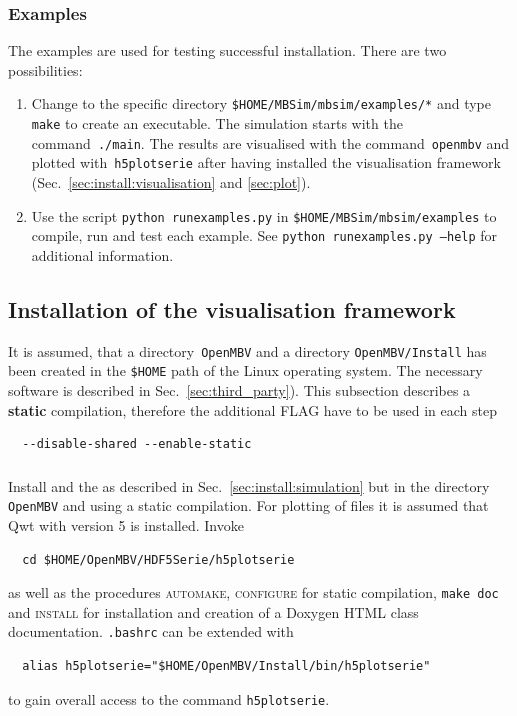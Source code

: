 \subsubsection{Examples}
The examples are used for testing successful installation. There are two possibilities:
\begin{enumerate}
\item Change to the specific directory \texttt{\$HOME/MBSim/mbsim/examples/*} and type \texttt{make} to create an executable. The simulation starts with the command~\texttt{./main}. The results are visualised with the command~\texttt{openmbv} and plotted with~\texttt{h5plotserie} after having installed the visualisation framework (Sec.~\ref{sec:install:visualisation} and \ref{sec:plot}).
\item Use the script \texttt{python runexamples.py} in \texttt{\$HOME/MBSim/mbsim/examples} to compile, run and test each example. See \texttt{python runexamples.py --help} for additional information.
\end{enumerate}
%
\subsection{Installation of the visualisation framework\label{sec:install:visualisation}}
It is assumed, that a directory~\texttt{OpenMBV} and a directory \texttt{OpenMBV/Install} has been created in the \texttt{\$HOME} path of the Linux operating system. The necessary software is described in Sec.~\ref{sec:third_party}). This subsection describes a \textbf{static} compilation, therefore the additional FLAG have to be used in each step
\begin{verbatim}
  --disable-shared --enable-static
\end{verbatim}

\subsubsection{\HDF}
Install \HDF{} and the \HDFSerie{} as described in Sec.~\ref{sec:install:simulation} but in the directory \texttt{OpenMBV} and using a static compilation. For plotting of \HDF{} files it is assumed that Qwt with version 5 is installed. Invoke 
\begin{verbatim}
  cd $HOME/OpenMBV/HDF5Serie/h5plotserie
\end{verbatim}
as well as the procedures \textsc{automake, configure} for static compilation, \texttt{make doc} and \textsc{install} for installation and creation of a Doxygen HTML class documentation. \texttt{.bashrc} can be extended with
\begin{verbatim}
  alias h5plotserie="$HOME/OpenMBV/Install/bin/h5plotserie"
\end{verbatim}
to gain overall access to the command \texttt{h5plotserie}.

